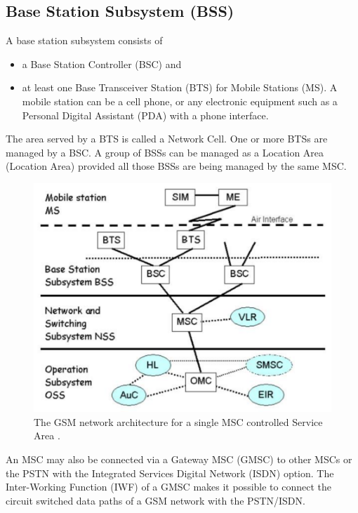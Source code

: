 \subsection{Base Station Subsystem (BSS)}

A base station subsystem consists of
\begin{itemize}[noitemsep,topsep=0pt,parsep=0pt,partopsep=0pt] 
\item a Base Station Controller (BSC) and
\item at least one Base Transceiver Station (BTS) for Mobile Stations (MS).
A mobile station can be a cell phone, or any electronic equipment such as a 
Personal Digital Assistant (PDA) with a phone interface.
\end{itemize}

The area served by a BTS is called a Network Cell. One or more BTSs
are managed by a BSC.  A group of BSSs can be managed as a Location 
Area (Location Area) provided all those BSSs are being managed by the same 
MSC.


\begin{figure}
\centering
\includegraphics[scale=0.4]{archMSCServiceArea}
\caption[Network architecture for a single MSC Service Area]{The GSM network 
architecture for a single MSC controlled Service Area {\cite{arcadaFi}}.}
\end{figure}


An MSC may also be connected via a Gateway MSC (GMSC) to other MSCs or the
PSTN with the Integrated Services Digital Network (ISDN) option. The 
Inter-Working Function (IWF) of a GMSC makes it possible to connect the 
circuit switched data paths of a GSM network with the PSTN/ISDN.

